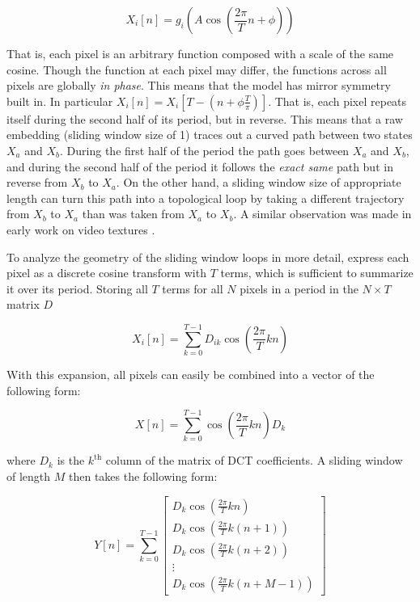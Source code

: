 \documentclass[a4paper,UKenglish]{lipics}
\begin{document}
\begin{equation}
X_i[n] = g_i \left( A \cos \left( \frac{2 \pi}{T} n + \phi \right) \right)
\end{equation}

That is, each pixel is an arbitrary function composed with a scale of the same cosine.  Though the function at each pixel may differ, the functions across all pixels are globally {\em in phase}.  This means that the model has mirror symmetry built in.  In particular $X_i[n] = X_i\left[ T - \left(n + \phi \frac{T}{\pi} \right) \right]$.  That is, each pixel repeats itself during the second half of its period, but in reverse.  This means that a raw embedding (sliding window size of 1) traces out a curved path between two states $X_a$ and $X_b$.  During the first half of the period the path goes between $X_a$ and $X_b$, and during the second half of the period it follows the {\em exact same} path but in reverse from $X_b$ to $X_a$.  On the other hand, a sliding window size of appropriate length can turn this path into a topological loop by taking a different trajectory from $X_b$ to $X_a$ than was taken from $X_a$ to $X_b$.  A similar observation was made in early work on video textures \cite{schodl2000video}.

To analyze the geometry of the sliding window loops in more detail, express each pixel as a discrete cosine transform with $T$ terms, which is sufficient to summarize it over its period.  Storing all $T$ terms for all $N$ pixels in a period in the $N \times T$ matrix $D$

\begin{equation}
X_i[n] = \sum_{k = 0}^{T-1} D_{ik} \cos \left( \frac{2 \pi}{T} k n  \right)
\end{equation}

With this expansion, all pixels can easily be combined into a vector of the following form:

\begin{equation}
\label{eq:rawexpansion}
X[n] = \sum_{k = 0}^{T-1} \cos \left( \frac{2 \pi}{T} k n \right) D_k
\end{equation}

where $D_k$ is the $k^{\text{th}}$ column of the matrix of DCT coefficients.  A sliding window of length $M$ then takes the following form:

\begin{equation}
Y[n] = \sum_{k = 0}^{T-1} \left[ \begin{array}{c} D_k \cos \left( \frac{2 \pi}{T} k n \right)  \\ D_k \cos \left( \frac{2 \pi}{T} k (n+1) \right) \\ D_k \cos \left( \frac{2 \pi}{T} k (n+2) \right) \\  \vdots \\ D_k \cos \left( \frac{2 \pi}{T} k (n+M-1) \right) \end{array} \right] 
\end{equation}
\end{document}
